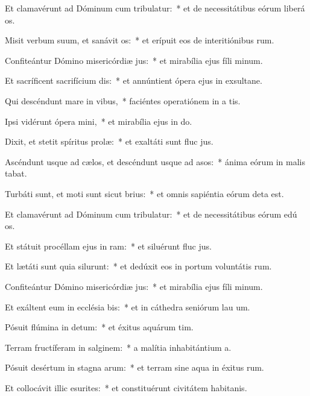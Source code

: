 \item Et clamavérunt ad Dóminum cum tribulatur:~* et de necessitátibus eórum liberá os.
\item Misit verbum suum, et sanávit os:~* et erípuit eos de interitiónibus rum.
\item Confiteántur Dómino misericórdiæ jus:~* et mirabília ejus fíli minum.
\item Et sacríficent sacrifícium dis:~* et annúntient ópera ejus in exsultane.
\item Qui descéndunt mare in vibus,~* faciéntes operatiónem in a tis.
\item Ipsi vidérunt ópera mini,~* et mirabília ejus in do.
\item Dixit, et stetit spíritus prolæ:~* et exaltáti sunt fluc jus.
\item Ascéndunt usque ad cælos, et descéndunt usque ad asos:~* ánima eórum in malis tabat.
\item Turbáti sunt, et moti sunt sicut brius:~* et omnis sapiéntia eórum deta est.
\item Et clamavérunt ad Dóminum cum tribulatur:~* et de necessitátibus eórum edú os.
\item Et státuit procéllam ejus in ram:~* et siluérunt fluc jus.
\item Et lætáti sunt quia silurunt:~* et dedúxit eos in portum voluntátis rum.
\item Confiteántur Dómino misericórdiæ jus:~* et mirabília ejus fíli minum.
\item Et exáltent eum in ecclésia bis:~* et in cáthedra seniórum lau um.
\item Pósuit flúmina in detum:~* et éxitus aquárum  tim.
\item Terram fructíferam in salginem:~* a malítia inhabitántium  a.
\item Pósuit desértum in stagna arum:~* et terram sine aqua in éxitus rum.
\item Et collocávit illic esurites:~* et constituérunt civitátem habitanis.
